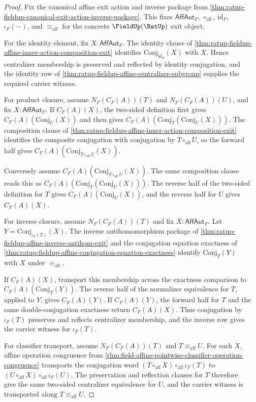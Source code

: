 \begin{proof}
Fix the canonical affine exit action and inverse package from
\autoref{thm:ratup-fieldup-canonical-exit-action-inverse-package}. This fixes
$\mathsf{AffAut}_F$, $\circ_{\mathrm{aff}}$, $\mathrm{id}_F$, $\iota_F(-)$,
and $\equiv_{\mathrm{aff}}$ for the concrete $\FieldUp(\RatUp)$ exit object.

For the identity element, fix $X:\mathsf{AffAut}_F$. The identity clause of
\autoref{thm:ratup-fieldup-affine-inner-action-composition-exit} identifies
$\mathrm{Conj}_{\mathrm{id}_F}(X)$ with $X$. Hence centralizer membership is
preserved and reflected by identity conjugation, and the identity row of
\autoref{thm:ratup-fieldup-affine-centralizer-subgroup} supplies the required
carrier witness.

For product closure, assume $N_F(C_F(A))(T)$ and $N_F(C_F(A))(U)$, and fix
$X:\mathsf{AffAut}_F$. If $C_F(A)(X)$, the two-sided definition first gives
$C_F(A)(\mathrm{Conj}_U(X))$ and then gives
$C_F(A)(\mathrm{Conj}_T(\mathrm{Conj}_U(X)))$. The composition clause of
\autoref{thm:ratup-fieldup-affine-inner-action-composition-exit} identifies
the composite conjugation with conjugation by $T\circ_{\mathrm{aff}}U$, so the
forward half gives $C_F(A)(\mathrm{Conj}_{T\circ_{\mathrm{aff}}U}(X))$.

Conversely assume $C_F(A)(\mathrm{Conj}_{T\circ_{\mathrm{aff}}U}(X))$. The
same composition clause reads this as
$C_F(A)(\mathrm{Conj}_T(\mathrm{Conj}_U(X)))$. The reverse half of the
two-sided definition for $T$ gives $C_F(A)(\mathrm{Conj}_U(X))$, and the
reverse half for $U$ gives $C_F(A)(X)$.

For inverse closure, assume $N_F(C_F(A))(T)$ and fix $X:\mathsf{AffAut}_F$.
Let $Y=\mathrm{Conj}_{\iota_F(T)}(X)$. The inverse antihomomorphism package of
\autoref{thm:ratup-fieldup-affine-inverse-antihom-exit} and the conjugation
equation exactness of
\autoref{thm:ratup-fieldup-affine-conjugation-equation-exactness} identify
$\mathrm{Conj}_T(Y)$ with $X$ under $\equiv_{\mathrm{aff}}$.

If $C_F(A)(X)$, transport this membership across the exactness comparison to
$C_F(A)(\mathrm{Conj}_T(Y))$. The reverse half of the normalizer equivalence for
$T$, applied to $Y$, gives $C_F(A)(Y)$. If $C_F(A)(Y)$, the forward half for
$T$ and the same double-conjugation exactness return $C_F(A)(X)$. Thus
conjugation by $\iota_F(T)$ preserves and reflects centralizer membership, and
the inverse row gives the carrier witness for $\iota_F(T)$.

For classifier transport, assume $N_F(C_F(A))(T)$ and
$T\equiv_{\mathrm{aff}}U$. For each $X$, affine operation congruence from
\autoref{thm:field-affine-pointwise-classifier-operation-congruence} transports
the conjugation word
$(T\circ_{\mathrm{aff}}X)\circ_{\mathrm{aff}}\iota_F(T)$ to
$(U\circ_{\mathrm{aff}}X)\circ_{\mathrm{aff}}\iota_F(U)$. The preservation and
reflection clauses for $T$ therefore give the same two-sided centralizer
equivalence for $U$, and the carrier witness is transported along
$T\equiv_{\mathrm{aff}}U$.
\end{proof}

